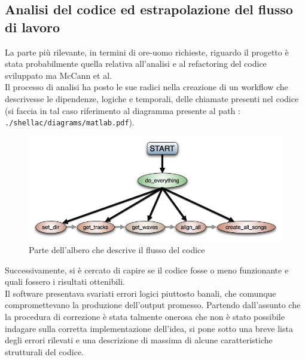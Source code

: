 \subsection{Analisi del codice ed estrapolazione del flusso di lavoro}
La parte più rilevante, in termini di ore-uomo richieste, riguardo il
progetto è stata probabilmente quella relativa all'analisi e al refactoring
del codice sviluppato ma McCann et al. \\
Il processo di analisi ha posto le sue radici nella creazione di un 
workflow che descrivesse le dipendenze, logiche e temporali, delle chiamate
presenti nel codice (si faccia in tal caso riferimento al diagramma presente
al path : \texttt{./shellac/diagrams/matlab.pdf}). 
\begin{figure}[h!t]
\begin{center}
\includegraphics[scale=0.3]{./img/workflow.png}
\caption{Parte dell'albero che descrive il flusso del codice}\label{fading}
\end{center}
\end{figure}
Successivamente, si è cercato di capire 
se il codice fosse o meno funzionante e quali fossero i risultati 
ottenibili. \\
Il software presentava svariati errori logici piuttosto banali, che 
comunque compromettevano la produzione dell'output promesso. Partendo
dall'assunto che la procedura di correzione è stata talmente
onerosa che non è stato possibile indagare sulla corretta implementazione
dell'idea, si pone sotto una breve lista degli errori rilevati e una 
descrizione di massima di alcune caratteristiche strutturali del codice.

